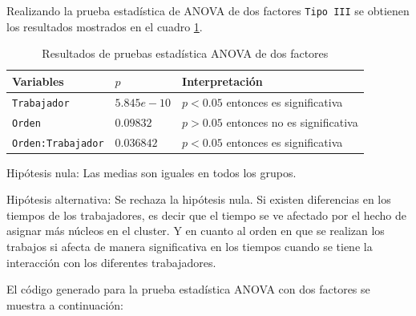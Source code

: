 \documentclass{article}
\begin{document}
\newpage

Realizando la prueba estadística de ANOVA de dos factores \texttt{Tipo III} se obtienen los resultados mostrados en el cuadro \ref{Cuadro 8}.

\begin{table}[ht]
\centering
\caption{Resultados de pruebas estadística ANOVA de dos factores}
\smallskip

 \begin{tabular}{ |p{3cm}|p{1.7cm}|p{6cm}|}
 \hline
 Variables & $p$ & Interpretación \\
 \hline
 \texttt{Trabajador} & $5.845e-10$ & $p < 0.05$ entonces es significativa\\
 \hline
 \texttt{Orden}  & $0.09832$ & $p > 0.05$ entonces no es significativa \\
 \hline
  \texttt{Orden:Trabajador}  & $0.036842$ & $p < 0.05$ entonces es significativa \\
 \hline
\end{tabular}
\label{Cuadro 8}
\end{table}

Hipótesis nula: Las medias son iguales en todos los grupos.
\smallskip

Hipótesis alternativa: Se rechaza la hipótesis nula. Si existen diferencias en los tiempos de los trabajadores, es decir que el tiempo se ve afectado por el hecho de asignar más núcleos en el cluster. Y en cuanto al orden en que se realizan los trabajos si afecta de manera significativa en los tiempos cuando se tiene la interacción con los diferentes trabajadores.

El código generado para la prueba estadística ANOVA con dos factores se muestra a continuación: 

\end{document}
